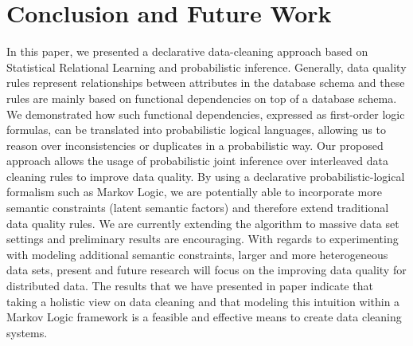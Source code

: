 
\section{Conclusion and Future Work}
\label{sec:conclusion}
In this paper, we presented a declarative data-cleaning approach based on Statistical Relational Learning and probabilistic inference. Generally, data quality rules represent relationships between attributes in the database schema and these rules are mainly based on functional dependencies on top of a database schema. We demonstrated how such functional dependencies, expressed as first-order logic formulas, can be translated into probabilistic logical languages, allowing us to reason over inconsistencies or duplicates in a probabilistic way. Our proposed approach allows the usage of probabilistic joint inference over interleaved data cleaning rules to improve data quality. By using a declarative probabilistic-logical formalism such as Markov Logic, we are potentially able to incorporate more semantic constraints (latent semantic factors) and therefore extend traditional data quality rules. We are currently extending the algorithm to massive data set settings and preliminary results are encouraging. With regards to experimenting with modeling additional semantic constraints, larger and more heterogeneous data sets, present and future research will focus on the improving data quality for distributed data. The results that we have presented in paper indicate that taking a holistic view on data cleaning and that modeling this intuition within a Markov Logic framework is a feasible and effective means to create data cleaning systems. 